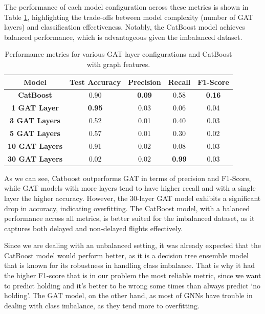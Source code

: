The performance of each model configuration across these metrics is
shown in Table \ref{tab:gat_catboost_metrics}, highlighting the
trade-offs between model complexity (number of GAT layers) and
classification effectiveness. Notably, the CatBoost model achieves
balanced performance, which is advantageous given the imbalanced
dataset.

\begin{table}[!htbp]
  \centering
  \caption{Performance metrics for various GAT layer configurations and CatBoost with graph features.}
  \label{tab:gat_catboost_metrics}
  \begin{tabular}{ccccc}
    \toprule
    \textbf{Model} & \textbf{Test Accuracy} & \textbf{Precision} & \textbf{Recall} & \textbf{F1-Score} \\
    \midrule
    \textbf{CatBoost} & 0.90 & \textbf{0.09} & 0.58 & \textbf{0.16} \\
    \textbf{1 GAT Layer} & \textbf{0.95} & 0.03 & 0.06 & 0.04 \\
    \textbf{3 GAT Layers} & 0.52 & 0.01 & 0.40 & 0.03 \\
    \textbf{5 GAT Layers} & 0.57 & 0.01 & 0.30 & 0.02 \\
    \textbf{10 GAT Layers} & 0.91 & 0.02 & 0.08 & 0.03 \\
    \textbf{30 GAT Layers} & 0.02 & 0.02 & \textbf{0.99} & 0.03 \\
    \bottomrule
  \end{tabular}%
\end{table}


As we can see, Catboost outperforms GAT in terms of precision and
F1-Score, while GAT models with more layers tend to have higher recall
and with a single layer the higher accuracy. However, the 30-layer GAT
model exhibits a significant drop in accuracy, indicating
overfitting. The CatBoost model, with a balanced performance across
all metrics, is better suited for the imbalanced dataset, as it
captures both delayed and non-delayed flights effectively.

Since we are dealing with an unbalanced setting, it was already
expected that the CatBoost model would perform better, as it is a
decision tree ensemble model that is known for its robustness in
handling class imbalance. That is why it had the higher F1-score that
is in our problem the most reliable metric, since we want to predict
holding and it's better to be wrong some times than always predict `no
holding'. The GAT model, on the other hand, as most of GNNs have
trouble in dealing with class imbalance, as they tend more to
overfitting.

